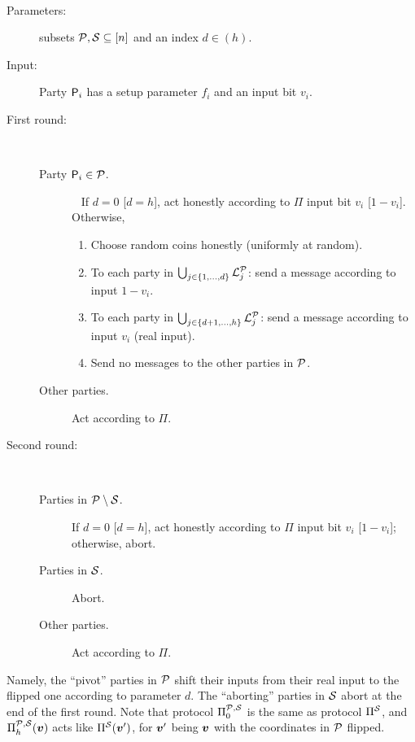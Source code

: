 { \samepage
\begin{protocol}[$\PP_d$]\label{prot:main:2} ~
\begin{description}
    \item [Parameters:] subsets $\mathcal{P},\mathcal{S} \subseteq [n]$ and an index $d\in (h)$.
    \item [Input:] Party $\mathsf{P}_i$ has a setup parameter $f_i$ and an input bit $v_i$.

	\item [First round:] ~
	\begin{description}
		\item[Party $\mathsf{P}_i \in \mathcal{P}$.] ~
		If $d=0$ [\resp $d=h$], act honestly according to  $\Pi$ \wrt input bit $v_i$ [\resp $1-v_i$].
		Otherwise,
		\begin{enumerate}
			\item Choose random coins honestly (\ie uniformly at random).
			
			\item To each party in $\bigcup_{j \in \left\{1,\ldots,d\right\}} {\cal{L}}_j^{\mathcal{P}}$: send a message according to input $ 1-v_i$.
			
			\item To each party in $\bigcup_{j \in \left\{d+1 ,\ldots, h\right\}} {\cal{L}}_j^{\mathcal{P}}$: send a message according to input $v_i$ (real input).
			
			\item Send no messages to the other parties in $\mathcal{P}$.
		\end{enumerate}
		
		\item[Other parties.] Act according to $\Pi$.
	\end{description}
	
	\item [Second round:]~
	\begin{description}
		\item[Parties in $\mathcal{P} \setminus {\cal{S}}$.] If $d=0$ [\resp $d=h$], act honestly according to $\Pi$ \wrt input bit $v_i$ [\resp $1-v_i$]; otherwise, abort.
		
		\item[Parties in $\mathcal{S}$.] Abort.
		

		
		\item[Other parties.] Act according to $\Pi$.
	\end{description}
\end{description}
\end{protocol}
}
Namely, the ``pivot'' parties in $\mathcal{P}$ shift their inputs from their real input to the flipped one according to parameter $d$. The ``aborting'' parties in ${\cal{S}}$ abort at the end of the first round. Note that protocol $\Pi^{\mathcal{P},\mathcal{S}}_{0}$ is the same as protocol $\Pi^{\cal{S}}$, and $\Pi^{\mathcal{P},\mathcal{S}}_h({ \boldsymbol{v}})$ acts like $\Pi^{\cal{S}}({ \boldsymbol{v}}')$, for ${ \boldsymbol{v}}'$ being ${ \boldsymbol{v}}$ with the coordinates in $\mathcal{P}$ flipped.

